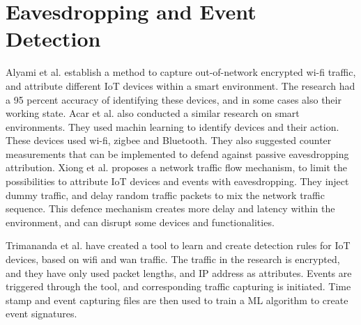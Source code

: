 \section{Eavesdropping and Event Detection}
Alyami et al. \cite{Eavs_relat_alyami2022wifi} establish a method to capture out-of-network encrypted wi-fi traffic, and attribute different IoT devices within a smart environment. The research had a 95 percent accuracy of identifying these devices, and in some cases also their working state. Acar et al. \cite{evas_relat_acar2020peek} also conducted a similar research on smart environments. They used machin learning to identify devices and their action. These devices used wi-fi, zigbee and Bluetooth. They also suggested counter measurements that can be implemented to defend against passive eavesdropping attribution.
Xiong et al. \cite{evas_relat_xiong2022network} proposes a network traffic flow mechanism, to limit the possibilities to attribute IoT devices and events with eavesdropping. They inject dummy traffic, and delay random traffic packets to mix the network traffic sequence. This defence mechanism creates more delay and latency within the environment, and can disrupt some devices and functionalities.

Trimananda et al. \cite{pingpong_trimananda2020packet} have created a tool to learn and create detection rules for IoT devices, based on wifi and wan traffic. The traffic in the research is encrypted, and they have only used packet lengths, and IP address as attributes. Events are triggered through the tool, and corresponding traffic capturing is initiated. Time stamp and event capturing files are then used to train a ML algorithm to create event signatures.


